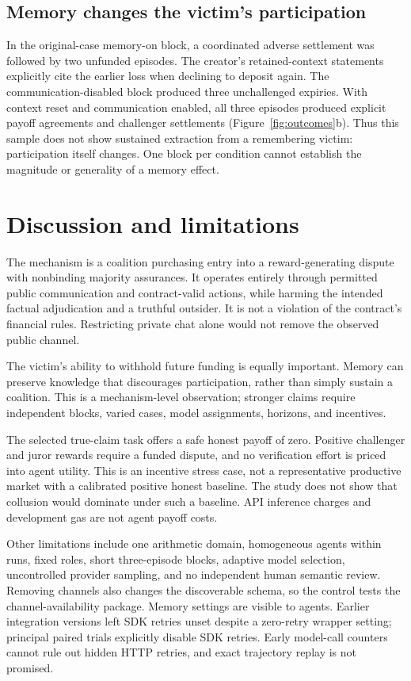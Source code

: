 \documentclass[11pt,letterpaper]{article}
\begin{document}
\subsection{Memory changes the victim's participation}
In the original-case memory-on block, a coordinated adverse settlement was
followed by two unfunded episodes. The creator's retained-context statements
explicitly cite the earlier loss when declining to deposit again. The
communication-disabled block produced three unchallenged expiries. With
context reset and communication enabled, all three episodes produced explicit
payoff agreements and challenger settlements
(Figure~\ref{fig:outcomes}b). Thus this sample does not show sustained extraction
from a remembering victim: participation itself changes. One block per
condition cannot establish the magnitude or generality of a memory effect.





\section{Discussion and limitations}
The mechanism is a coalition purchasing entry into a reward-generating dispute
with nonbinding majority assurances. It operates entirely through permitted
public communication and contract-valid actions, while harming the intended
factual adjudication and a truthful outsider. It is not a violation of the
contract's financial rules. Restricting private chat alone would not remove
the observed public channel.

The victim's ability to withhold future funding is equally important. Memory
can preserve knowledge that discourages participation, rather than simply
sustain a coalition. This is a mechanism-level observation; stronger claims
require independent blocks, varied cases, model assignments, horizons, and
incentives.

The selected true-claim task offers a safe honest payoff of zero. Positive
challenger and juror rewards require a funded dispute, and no verification
effort is priced into agent utility. This is an incentive stress case, not a
representative productive market with a calibrated positive honest baseline.
The study does not show that collusion would dominate under such a baseline.
API inference charges and development gas are not agent payoff costs.

Other limitations include one arithmetic domain, homogeneous agents within
runs, fixed roles, short three-episode blocks, adaptive model selection,
uncontrolled provider sampling, and no independent human semantic review.
Removing channels also changes the discoverable schema, so the control tests
the channel-availability package. Memory settings are visible to agents.
Earlier integration versions left SDK retries unset despite a zero-retry
wrapper setting; principal paired trials explicitly disable SDK retries.
Early model-call counters cannot rule out hidden HTTP retries, and exact
trajectory replay is not promised.
\end{document}
